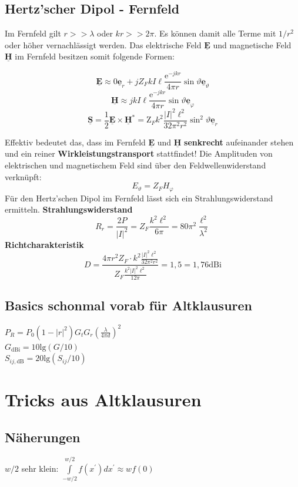 \documentclass[english]{latex4ei/latex4ei_sheet}
\renewcommand{\vec}[1]{\underline{\boldsymbol{#1}}}
\begin{document}
\begin{sectionbox}
\subsection{Hertz'scher Dipol - Fernfeld}
Im Fernfeld gilt $r >> \lambda$ oder $kr >> 2\pi$. Es können damit alle Terme mit $1/r^2$ oder höher vernachlässigt werden. Das elektrische Feld $\vec{E}$ und magnetische Feld $\vec{H}$ im Fernfeld besitzen somit folgende Formen:
\begin{emphbox}
$$
\vec{E} \approx 0 \vec{e}_{r}+j Z_{F} k I \ell \frac{\mathrm{e}^{-j k r}}{4 \pi r} \sin \vartheta \vec{e}_{\vartheta}
$$
$$
\vec{H} \approx j k I \ell \frac{\mathrm{e}^{-j k r}}{4 \pi r} \sin \vartheta \vec{e}_{\varphi}
$$
$$
\vec{S}=\frac{1}{2} \vec{E} \times \vec{H}^{*}=\mathrm{Z}_{F} k^{2} \frac{|I|^{2} \ell^{2}}{32 \pi^{2} r^{2}} \sin ^{2} \vartheta \vec{e}_{r}
$$
\end{emphbox}
Effektiv bedeutet das, dass im Fernfeld $\vec{E}$ und $\vec{H}$ \textbf{senkrecht} aufeinander stehen und ein reiner \textbf{Wirkleistungstransport} stattfindet!
Die Amplituden von elektrischen und magnetischem Feld sind über den Feldwellenwiderstand verknüpft:
$$
E_{\vartheta}=Z_{F} H_{\varphi}
$$
Für den Hertz'schen Dipol im Fernfeld lässt sich ein Strahlungswiderstand ermitteln.
\textbf{Strahlungswiderstand}
$$
R_{r}=\frac{2 P}{|I|^{2}}=Z_{F} \frac{k^{2} \ell^{2}}{6 \pi}=80 \pi^{2} \frac{\ell^{2}}{\lambda^{2}}
$$
\textbf{Richtcharakteristik}
$$
D=\frac{4 \pi r^{2} Z_{F} \cdot k^{2} \frac{|I|^{2} \ell^{2}}{32 \pi^{2} r^{2}}}{Z_{F} \frac{k^{2}|I|^{2} \ell^{2}}{12 \pi}}=1,5=1,76 \mathrm{dBi}
$$
\end{sectionbox}

\begin{sectionbox}
\subsection{Basics schonmal vorab für Altklausuren}
$P_R = P_0 (1 - |r|^2)G_tG_r\left(\frac{\lambda}{4\pi d}\right)^2$\\
$G_{\text{dBi}} = 10\text{lg}(G / 10)$\\
$S_{ij, \text{dB}} = 20\text{lg}(S_{ij} / 10)$\\
\end{sectionbox}

\section{Tricks aus Altklausuren}
\begin{sectionbox}
	\subsection{Näherungen}
	$w/2$ sehr klein: $\int\limits_{-w/2}^{w/2}f(x^{\prime}) d x^{\prime} \approx w f(0)$\\
\end{sectionbox}
\end{document}
